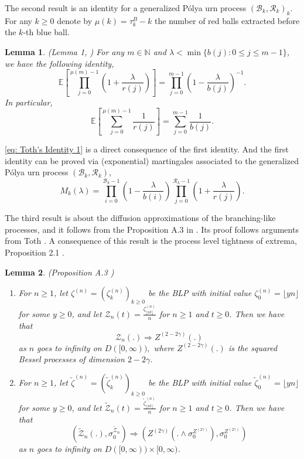 \documentclass[twoside,12pt,a4paper]{article}
\newtheorem{lemma}{Lemma}[section]
\numberwithin{equation}{section}
\begin{document}
	The second result is an identity for a generalized P\'{o}lya urn process $(\mathcal{B}_{k},\mathcal{R}_{k})_k$. For any $k\geq 0$ denote by $\mu(k)= \tau^B_k - k$ the number of red balls extracted before the $k$-th blue ball. 
	\begin{lemma}(Lemma 1, \cite{T96}) \label{lm: Toth's Identity}
		For any $m\in \mathbb{N}$ and $\lambda < \min\{ b(j): 0\leq j\leq m-1 \}$, we have the following identity,
		$$  \mathbb{E}\left[  \prod_{j=0}^{ \mu(m)-1 } \left(1+ \frac{\lambda}{r(j)}   \right) \right] =   \prod_{j=0}^{ m-1 } \left(1- \frac{\lambda}{b(j)}   \right)^{-1}.   $$ 
		In particular, 
		\begin{equation}\label{eq: Toth's Identity 1}
			\mathbb{E}\left[  \sum_{j=0}^{ \mu(m)-1 } \frac{1}{r(j)}   \right] =   \sum_{j=0}^{ m-1 } \frac{1}{b(j)}.
		\end{equation}	
	\end{lemma}
	\eqref{eq: Toth's Identity 1} is a direct consequence of the first identity. And the first identity can be proved via (exponential) martingales associated to the generalized P\'{o}lya urn process $(\mathcal{B}_{k},\mathcal{R}_{k})$, 
	$$M_k(\lambda) = \prod_{i=0}^{ \mathcal{B}_{k}-1 } \left(1-\frac{\lambda}{b(i)}\right) \prod_{j=0}^{\mathcal{R}_{k}-1 } \left(1+\frac{\lambda}{r(j)}\right). $$
	
	The third result is about the diffusion approximations of the branching-like processes, and it follows from the Proposition A.3 in \cite{KMP22}. Its proof follows arguments from Toth \cite{T96}. A consequence of this result is the process level tightness of extrema, Proposition 2.1 \cite{KMP22}. 
	
	\begin{lemma}(Proposition A.3 \cite{KMP22})\label{lm: diffusion approximation of blp}
		\begin{enumerate}
			\item 
			For $n\geq 1$, let $\zeta^{(n)}=(\zeta^{(n)}_k)_{k\geq 0 }  $ be the BLP with initial value $\zeta^{(n)}_0 = \lfloor yn \rfloor$ for some $y \geq 0$, and let $\mathcal{Z}_n(t) = \frac{\zeta^{(n)}_{\lfloor nt \rfloor}}{n}$ for $n\geq 1$ and $t\geq 0$. Then we have that 
			$$
			\mathcal{Z}_n(.) \Longrightarrow Z^{(2-2\gamma)}(.)
			$$ as $n$ goes to infinity on $D([0,\infty)),$ where $Z^{(2-2\gamma)}(.)$ is the squared Bessel processes of dimension $2-2\gamma$.
			
			\item
			For $n\geq 1$, let $\tilde\zeta^{(n)}=(\tilde\zeta^{(n)}_k)_{k\geq 0 }  $ be the BLP with initial value $\tilde\zeta^{(n)}_0 = \lfloor yn \rfloor$ for some $y \geq 0$, and let $\tilde{\mathcal{Z}}_n(t) = \frac{\tilde\zeta^{(n)}_{\lfloor nt \rfloor}}{n}$ for $n\geq 1$ and $t\geq 0$. Then we have that 
			$$
			\left(\tilde{\mathcal{Z}}_n(.), \sigma_0^{\tilde{\mathcal{Z}}_n}\right) 
			\Longrightarrow \left(Z^{(2\gamma)}(. \wedge \sigma_0^{Z^{(2 \gamma)}}), \sigma_0^{Z^{(2 \gamma)}}\right)
			$$ as $n$ goes to infinity on $D([0,\infty)) \times [0,\infty )$.
		\end{enumerate}
		
		
	\end{lemma}
	
\end{document}
